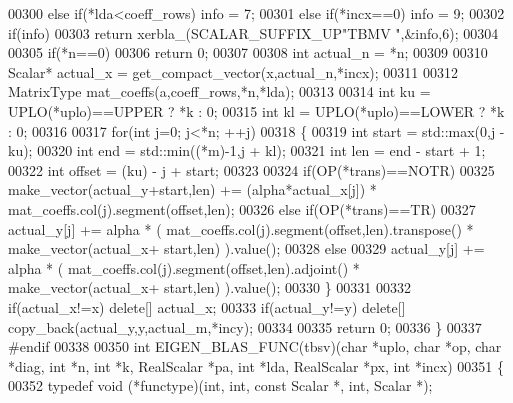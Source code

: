\begin{DoxyCode}
00300   \textcolor{keywordflow}{else} \textcolor{keywordflow}{if}(*lda<coeff\_rows)                                            info = 7;
00301   \textcolor{keywordflow}{else} \textcolor{keywordflow}{if}(*incx==0)                                                   info = 9;
00302   \textcolor{keywordflow}{if}(info)
00303     \textcolor{keywordflow}{return} xerbla\_(SCALAR\_SUFFIX\_UP\textcolor{stringliteral}{"TBMV "},&info,6);
00304 
00305   \textcolor{keywordflow}{if}(*n==0)
00306     \textcolor{keywordflow}{return} 0;
00307 
00308   \textcolor{keywordtype}{int} actual\_n = *n;
00309 
00310   Scalar* actual\_x = get\_compact\_vector(x,actual\_n,*incx);
00311 
00312   MatrixType mat\_coeffs(a,coeff\_rows,*n,*lda);
00313 
00314   \textcolor{keywordtype}{int} ku = UPLO(*uplo)==UPPER ? *k : 0;
00315   \textcolor{keywordtype}{int} kl = UPLO(*uplo)==LOWER ? *k : 0;
00316 
00317   \textcolor{keywordflow}{for}(\textcolor{keywordtype}{int} j=0; j<*n; ++j)
00318   \{
00319     \textcolor{keywordtype}{int} start = std::max(0,j - ku);
00320     \textcolor{keywordtype}{int} end = std::min((*m)-1,j + kl);
00321     \textcolor{keywordtype}{int} len = end - start + 1;
00322     \textcolor{keywordtype}{int} offset = (ku) - j + start;
00323 
00324     \textcolor{keywordflow}{if}(OP(*trans)==NOTR)
00325       make\_vector(actual\_y+start,len) += (alpha*actual\_x[j]) * mat\_coeffs.col(j).segment(offset,len);
00326     \textcolor{keywordflow}{else} \textcolor{keywordflow}{if}(OP(*trans)==TR)
00327       actual\_y[j] += alpha * ( mat\_coeffs.col(j).segment(offset,len).transpose() * make\_vector(actual\_x+
      start,len) ).value();
00328     \textcolor{keywordflow}{else}
00329       actual\_y[j] += alpha * ( mat\_coeffs.col(j).segment(offset,len).adjoint()   * make\_vector(actual\_x+
      start,len) ).value();
00330   \}
00331 
00332   \textcolor{keywordflow}{if}(actual\_x!=x) \textcolor{keyword}{delete}[] actual\_x;
00333   \textcolor{keywordflow}{if}(actual\_y!=y) \textcolor{keyword}{delete}[] copy\_back(actual\_y,y,actual\_m,*incy);
00334 
00335   \textcolor{keywordflow}{return} 0;
00336 \}
00337 \textcolor{preprocessor}{#endif}
00338 
00350 \textcolor{keywordtype}{int} EIGEN\_BLAS\_FUNC(tbsv)(\textcolor{keywordtype}{char} *uplo, \textcolor{keywordtype}{char} *op, \textcolor{keywordtype}{char} *diag, \textcolor{keywordtype}{int} *n, \textcolor{keywordtype}{int} *k, RealScalar *pa, \textcolor{keywordtype}{int} *lda, 
      RealScalar *px, \textcolor{keywordtype}{int} *incx)
00351 \{
00352   \textcolor{keyword}{typedef} void (*functype)(int, int, \textcolor{keyword}{const} Scalar *, int, Scalar *);

\end{DoxyCode}
